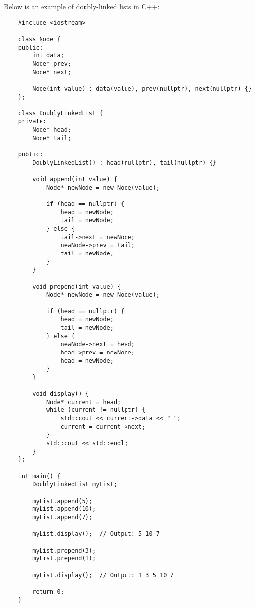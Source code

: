 \begin{solution}
    Below is an example of doubly-linked lists in C++:

    \horizontalline

    \begin{verbatim}
    #include <iostream>

    class Node {
    public:
        int data;
        Node* prev;
        Node* next;

        Node(int value) : data(value), prev(nullptr), next(nullptr) {}
    };

    class DoublyLinkedList {
    private:
        Node* head;
        Node* tail;

    public:
        DoublyLinkedList() : head(nullptr), tail(nullptr) {}

        void append(int value) {
            Node* newNode = new Node(value);

            if (head == nullptr) {
                head = newNode;
                tail = newNode;
            } else {
                tail->next = newNode;
                newNode->prev = tail;
                tail = newNode;
            }
        }

        void prepend(int value) {
            Node* newNode = new Node(value);

            if (head == nullptr) {
                head = newNode;
                tail = newNode;
            } else {
                newNode->next = head;
                head->prev = newNode;
                head = newNode;
            }
        }

        void display() {
            Node* current = head;
            while (current != nullptr) {
                std::cout << current->data << " ";
                current = current->next;
            }
            std::cout << std::endl;
        }
    };

    int main() {
        DoublyLinkedList myList;

        myList.append(5);
        myList.append(10);
        myList.append(7);

        myList.display();  // Output: 5 10 7

        myList.prepend(3);
        myList.prepend(1);

        myList.display();  // Output: 1 3 5 10 7

        return 0;
    }
    \end{verbatim}

    \horizontalline


\end{solution}
